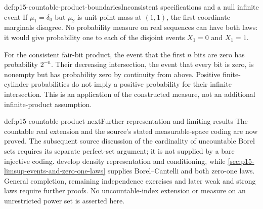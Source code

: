 \begin{hbexample}{def:p15-countable-product-boundaries}{Inconsistent specifications and a null infinite event}
If \(\mu_1=\delta_0\) but \(\mu_2\) is unit point mass at \((1,1)\), the
first-coordinate marginals disagree. No probability measure on real
sequences can have both laws: it would give probability one to each
of the disjoint events \(X_1=0\) and \(X_1=1\).

For the consistent fair-bit product, the event that the first \(n\)
bits are zero has probability \(2^{-n}\). Their decreasing
intersection, the event that every bit is zero, is nonempty but has
probability zero by continuity from above. Positive finite-cylinder
probabilities do not imply a positive probability for their infinite
intersection. This is an application of the constructed measure,
not an additional infinite-product assumption.
\end{hbexample}

\begin{proofboundary}{def:p15-countable-product-next}{Further representation and limiting results}
The countable real extension and the source's stated measurable-space
coding are now proved. The subsequent source discussion of the cardinality
of uncountable Borel sets requires its separate perfect-set argument;
it is not supplied by a bare injective coding.
develop density representation and conditioning, while
\cref{sec:p15-limsup-events-and-zero-one-laws} supplies Borel--Cantelli
and both zero-one laws. General completion, remaining independence
exercises and later weak and strong laws require further proofs.
No uncountable-index extension or measure on an unrestricted power set
is asserted here.
\end{proofboundary}
